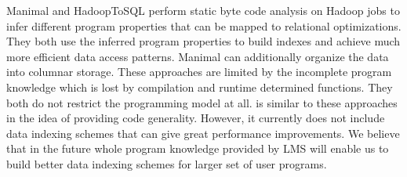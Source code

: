 Manimal and HadoopToSQL perform static byte code analysis on Hadoop jobs to infer different program properties that can be mapped to relational optimizations. They both use the inferred program properties to build indexes and achieve much more efficient data access patterns. Manimal can additionally organize the data into columnar storage. These approaches are limited by the incomplete program knowledge which is lost by compilation and runtime determined functions. They both do not restrict the programming model at all. 
\tool is similar to these approaches in the idea of providing code generality. However, it currently does not include data indexing schemes that can give great performance improvements. We believe that in the future whole program knowledge provided by LMS will enable us to build better data indexing schemes for larger set of user programs.    
